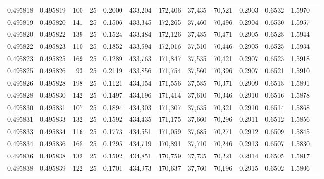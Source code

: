 \begin{tabular}{rrrrrrrrrrrrr}
0.495818 & 0.495819 &   100 &  25 &                                     0.2000 & 433,204 & 172,406 &  37,435 &  70,521 & 0.2903 & 0.6532 & 1.5970 \\
0.495819 & 0.495820 &   141 &  25 &                                     0.1506 & 433,345 & 172,265 &  37,460 &  70,496 & 0.2904 & 0.6530 & 1.5957 \\
0.495820 & 0.495822 &   139 &  25 &                                     0.1524 & 433,484 & 172,126 &  37,485 &  70,471 & 0.2905 & 0.6528 & 1.5944 \\
0.495822 & 0.495823 &   110 &  25 &                                     0.1852 & 433,594 & 172,016 &  37,510 &  70,446 & 0.2905 & 0.6525 & 1.5934 \\
0.495823 & 0.495825 &   169 &  25 &                                     0.1289 & 433,763 & 171,847 &  37,535 &  70,421 & 0.2907 & 0.6523 & 1.5918 \\
0.495825 & 0.495826 &    93 &  25 &                                     0.2119 & 433,856 & 171,754 &  37,560 &  70,396 & 0.2907 & 0.6521 & 1.5910 \\
0.495826 & 0.495828 &   198 &  25 &                                     0.1121 & 434,054 & 171,556 &  37,585 &  70,371 & 0.2909 & 0.6518 & 1.5891 \\
0.495828 & 0.495830 &   142 &  25 &                                     0.1497 & 434,196 & 171,414 &  37,610 &  70,346 & 0.2910 & 0.6516 & 1.5878 \\
0.495830 & 0.495831 &   107 &  25 &                                     0.1894 & 434,303 & 171,307 &  37,635 &  70,321 & 0.2910 & 0.6514 & 1.5868 \\
0.495831 & 0.495833 &   132 &  25 &                                     0.1592 & 434,435 & 171,175 &  37,660 &  70,296 & 0.2911 & 0.6512 & 1.5856 \\
0.495833 & 0.495834 &   116 &  25 &                                     0.1773 & 434,551 & 171,059 &  37,685 &  70,271 & 0.2912 & 0.6509 & 1.5845 \\
0.495834 & 0.495836 &   168 &  25 &                                     0.1295 & 434,719 & 170,891 &  37,710 &  70,246 & 0.2913 & 0.6507 & 1.5830 \\
0.495836 & 0.495838 &   132 &  25 &                                     0.1592 & 434,851 & 170,759 &  37,735 &  70,221 & 0.2914 & 0.6505 & 1.5817 \\
0.495838 & 0.495839 &   122 &  25 &                                     0.1701 & 434,973 & 170,637 &  37,760 &  70,196 & 0.2915 & 0.6502 & 1.5806 \\

\end{tabular}
